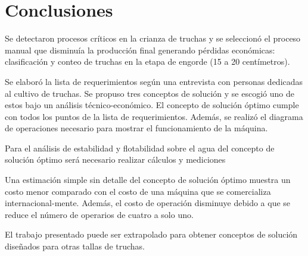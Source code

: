 

\chapter*{\centering \large Conclusiones}


Se detectaron procesos críticos en la crianza de truchas y se seleccionó el proceso manual que disminuía la producción final generando pérdidas económicas: clasificación y conteo de truchas en la etapa de engorde (15 a 20 centímetros).

Se elaboró la lista de requerimientos según una entrevista con personas dedicadas al cultivo de truchas. Se propuso tres conceptos de solución y se escogió uno de estos bajo un análisis técnico-económico. El concepto de solución óptimo cumple con todos los puntos de la lista de requerimientos. Además, se realizó el diagrama de operaciones necesario para mostrar el funcionamiento de la máquina.

Para el análisis de estabilidad y flotabilidad sobre el agua del concepto de solución óptimo será necesario realizar cálculos y mediciones 

Una estimación simple sin detalle del concepto de solución óptimo muestra un costo menor comparado con el costo de una máquina que se comercializa internacional-mente. Además, el costo de operación disminuye debido a que se reduce el número de operarios de cuatro a solo uno.

El trabajo presentado puede ser extrapolado para obtener conceptos de solución diseñados para otras tallas de truchas.

